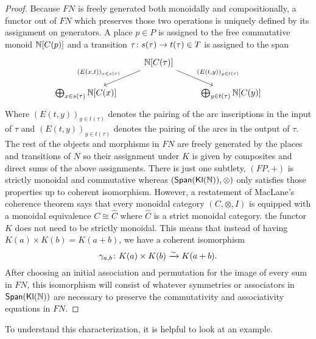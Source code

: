 \begin{proof}
    Because $FN$ is freely generated both monoidally and compositionally, a functor out of $FN$ which preserves those two operations is uniquely defined by its assignment on generators. A place $p \in P$ is assigned to the free commutative monoid $\mathbb{N}[C(p)]$ and a transition $\tau \colon s(\tau) \to t(\tau) \in T$ is assigned to the span 
    \[\begin{tikzcd}
        &
        \N[C(\tau)]
        \ar[dl, "({E(x, t)})_{x \in s(\tau)}", swap] 
        \ar[dr, "({E(t, y)})_{y \in t(\tau)}"] 
        &\\
        \bigoplus_{x \in s(\tau)} \N[C(x)] 
        && 
        \bigoplus_{y \in t(\tau)} \N[C(y)]
    \end{tikzcd}\]
    Where $({E(t, y)})_{y \in t(\tau)}$ denotes the pairing of the arc inscriptions in the input of $\tau$ and $({E(t, y)})_{y \in t(\tau)}$ denotes the pairing of the arcs in the output of $\tau$. The rest of the objects and morphisms in $FN$ are freely generated by the places and transitions of $N$ so their assignment under $K$ is given by composites and direct sums of the above assignments. There is just one subtlety, $(FP, +)$ is strictly monoidal and commutative whereas $(\mathsf{Span}(\mathsf{\mathsf{Kl}(\mathbb{N}) }), \otimes)$ only satisfies those properties up to coherent isomorphism. However, a restatement of MacLane's coherence theorem \cite{mac1963natural} says that every monoidal category $(C,\otimes, I)$ is equipped with a monoidal equivalence $C \cong \hat{C}$ where $\hat{C}$ is a strict monoidal category. the functor $K$ does not need to be strictly monoidal. This means that instead of having $K(a) \times K(b) = K(a + b)$, we have a coherent isomorphism \[ 
        \gamma_{a, b} \colon K(a) \times K(b) \xrightarrow{\sim} K(a+b). 
    \]
    After choosing an initial association and permutation for the image of every sum in $FN$, this isomorphism will consist of whatever symmetries or associators in $\mathsf{Span}(\mathsf{\mathsf{Kl}(\mathbb{N}) })$ are necessary to preserve the commutativity and associativity equations in $FN$.
\end{proof}
To understand this characterization, it is helpful to look at an example.
